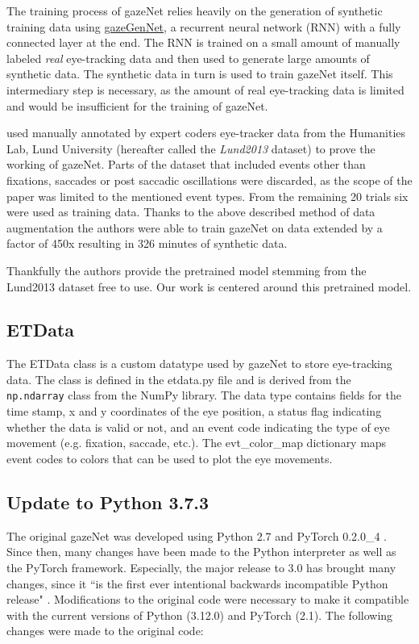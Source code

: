 \documentclass[conference]{IEEEtran}
\begin{document}
The training process of gazeNet relies heavily on the generation of synthetic training data using \href{https://github.com/r-zemblys/gazeGenNet}{gazeGenNet}, a recurrent neural network (RNN) with a fully connected layer at the end. The RNN is trained on a small amount of manually labeled \emph{real} eye-tracking data and then used to generate large amounts of synthetic data. The synthetic data in turn is used to train gazeNet itself. This intermediary step is necessary, as the amount of real eye-tracking data is limited and would be insufficient for the training of gazeNet. \cite{zemblys2018gazeNet}

\cite{zemblys2018gazeNet} used manually annotated by expert coders eye-tracker data from the Humanities Lab, Lund University (hereafter called the \emph{Lund2013} dataset) to prove the working of gazeNet. Parts of the dataset that included events other than fixations, saccades or post saccadic oscillations were discarded, as the scope of the paper was limited to the mentioned event types. From the remaining 20 trials six were used as training data. Thanks to the above described method of data augmentation the authors were able to train gazeNet on data extended by a factor of 450x resulting in 326 minutes of synthetic data.

Thankfully the authors provide the pretrained model stemming from the Lund2013 dataset free to use. Our work is centered around this pretrained model.

\subsection{ETData}
The ETData class is a custom datatype used by gazeNet to store eye-tracking data. The class is defined in the etdata.py file and is derived from the \verb|np.ndarray| class from the NumPy library. The data type contains fields for the time stamp, x and y coordinates of the eye position, a status flag indicating whether the data is valid or not, and an event code indicating the type of eye movement (e.g. fixation, saccade, etc.). The evt\_color\_map dictionary maps event codes to colors that can be used to plot the eye movements.


\subsection{Update to Python 3.7.3}
The original gazeNet was developed using Python 2.7 and PyTorch 0.2.0\_4 \cite{zemblys2018gazeNet}. Since then, many changes have been made to the Python interpreter as well as the PyTorch framework. Especially, the major release to 3.0 has brought many changes, since it ``is the first ever intentional backwards incompatible Python release" \cite{van_Rossum_2009}. Modifications to the original code were necessary to make it compatible with the current versions of Python (3.12.0) and PyTorch (2.1). The following changes were made to the original code:
\end{document}
